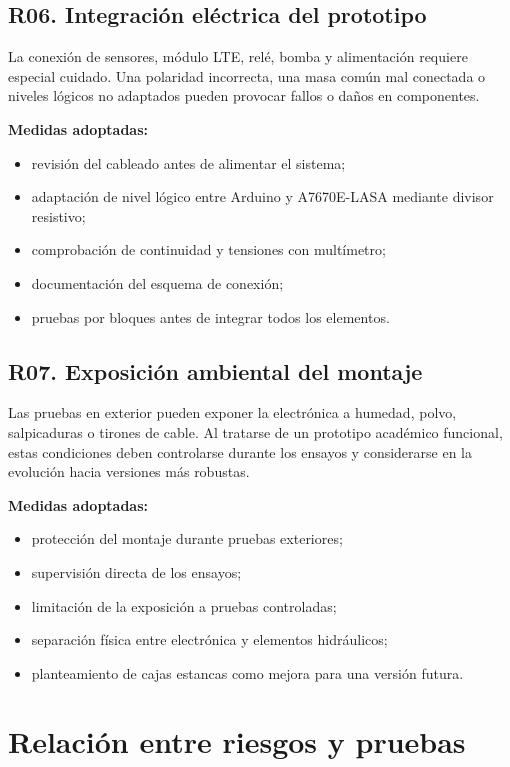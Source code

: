 \subsection{R06. Integración eléctrica del prototipo}

La conexión de sensores, módulo LTE, relé, bomba y alimentación requiere especial cuidado. Una polaridad incorrecta, una masa común mal conectada o niveles lógicos no adaptados pueden provocar fallos o daños en componentes.

\textbf{Medidas adoptadas:}

\begin{itemize}
    \item revisión del cableado antes de alimentar el sistema;
    \item adaptación de nivel lógico entre Arduino y A7670E-LASA mediante divisor resistivo;
    \item comprobación de continuidad y tensiones con multímetro;
    \item documentación del esquema de conexión;
    \item pruebas por bloques antes de integrar todos los elementos.
\end{itemize}

\subsection{R07. Exposición ambiental del montaje}

Las pruebas en exterior pueden exponer la electrónica a humedad, polvo, salpicaduras o tirones de cable. Al tratarse de un prototipo académico funcional, estas condiciones deben controlarse durante los ensayos y considerarse en la evolución hacia versiones más robustas.

\textbf{Medidas adoptadas:}

\begin{itemize}
    \item protección del montaje durante pruebas exteriores;
    \item supervisión directa de los ensayos;
    \item limitación de la exposición a pruebas controladas;
    \item separación física entre electrónica y elementos hidráulicos;
    \item planteamiento de cajas estancas como mejora para una versión futura.
\end{itemize}

\section{Relación entre riesgos y pruebas}

